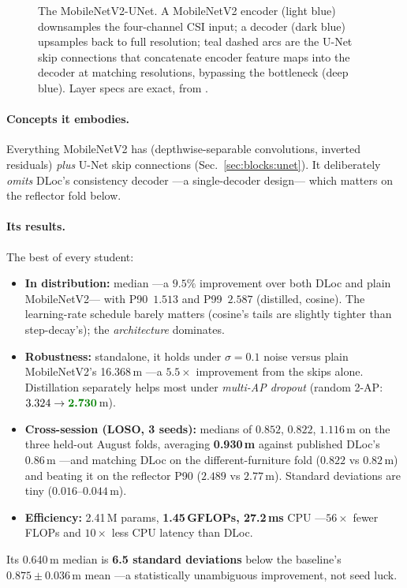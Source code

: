 \begin{figure}[H]
\centering
\resizebox{\linewidth}{!}{}
\caption{The MobileNetV2-UNet. A MobileNetV2 encoder (light blue) downsamples the four-channel CSI
input; a decoder (dark blue) upsamples back to full resolution; teal dashed arcs are the U-Net skip
connections that concatenate encoder feature maps into the decoder at matching resolutions, bypassing
the bottleneck (deep blue). Layer specs are exact, from .}
\label{fig:arch:unet}
\end{figure}

\paragraph{Concepts it embodies.} Everything MobileNetV2 has (depthwise-separable convolutions,
inverted residuals) \emph{plus} U-Net skip connections (Sec.~\ref{sec:blocks:unet}). It deliberately
\emph{omits} DLoc's consistency decoder ---a single-decoder design--- which matters on the reflector
fold below.

\paragraph{Its results.} The best of every student:
\begin{itemize}[leftmargin=1.4em,nosep]
  \item \textbf{In distribution:}  median ---a $9.5\%$ improvement over both DLoc and
  plain MobileNetV2--- with P90~$1.513$ and P99~$2.587$ (distilled, cosine). The learning-rate
  schedule barely matters (cosine's tails are slightly tighter than step-decay's); the
  \emph{architecture} dominates.
  \item \textbf{Robustness:} standalone, it holds  under $\sigma{=}0.1$ noise versus
  plain MobileNetV2's 16.368\,m ---a $\mathbf{5.5\times}$ improvement from the skips alone. Distillation
  separately helps most under \emph{multi-AP dropout} (random 2-AP: $3.324\to\best{2.730}$\,m).
  \item \textbf{Cross-session (LOSO, 3 seeds):} medians of $0.852$, $0.822$, $1.116$\,m on the three
  held-out August folds, averaging \textbf{0.930\,m} against published DLoc's 0.86\,m ---and matching
  DLoc on the different-furniture fold ($0.822$ vs $0.82$\,m) and beating it on the reflector P90
  ($2.489$ vs $2.77$\,m). Standard deviations are tiny ($0.016$--$0.044$\,m).
  \item \textbf{Efficiency:} 2.41\,M params, \textbf{1.45\,GFLOPs, 27.2\,ms} CPU ---$56\times$ fewer
  FLOPs and $10\times$ less CPU latency than DLoc.
\end{itemize}
Its 0.640\,m median is \textbf{6.5 standard deviations} below the baseline's $0.875\pm0.036$\,m mean
---a statistically unambiguous improvement, not seed luck.

